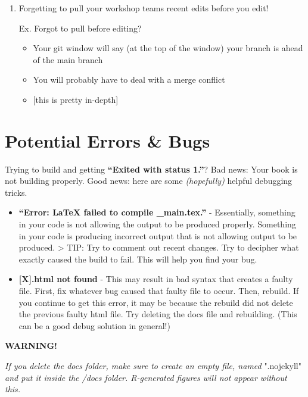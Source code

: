 \documentclass[
]{book}
\providecommand{\tightlist}{%
  \setlength{\itemsep}{0pt}\setlength{\parskip}{0pt}}
\newenvironment{redbox}{
  \definecolor{shadecolor}{RGB}{243, 154, 157}
  \color{white}
  \begin{shaded}}
 {\end{shaded}}
\theoremstyle{definition}
\theoremstyle{definition}
\theoremstyle{definition}
\theoremstyle{definition}
\theoremstyle{remark}
\begin{document}
\begin{enumerate}
\def\labelenumi{\arabic{enumi}.}
\item
  Forgetting to pull your workshop teams recent edits before you edit!

  Ex. Forgot to pull before editing?

  \begin{itemize}
  \tightlist
  \item
    Your git window will say (at the top of the window) your branch is ahead of the main branch
  \item
    You will probably have to deal with a merge conflict
  \item
    {[}this is pretty in-depth{]}
  \end{itemize}
\end{enumerate}

\section{Potential Errors \& Bugs}\label{potential-errors-bugs}

Trying to build and getting \textbf{``Exited with status 1.''}? Bad news: Your book is not building properly. Good news: here are some \emph{(hopefully)} helpful debugging tricks.

\begin{itemize}
\item
  \textbf{``Error: LaTeX failed to compile \_main.tex.''} - Essentially, something in your code is not allowing the output to be produced properly. Something in your code is producing incorrect output that is not allowing output to be produced.
  \textgreater{} TIP: Try to comment out recent changes. Try to decipher what exactly caused the build to fail. This will help you find your bug.
\item
  \textbf{{[}X{]}.html not found} - This may result in bad syntax that creates a faulty file. First, fix whatever bug caused that faulty file to occur. Then, rebuild. If you continue to get this error, it may be because the rebuild did not delete the previous faulty html file. Try deleting the docs file and rebuilding. (This can be a good debug solution in general!)
\end{itemize}

\begin{redbox}

\begin{center}
\textbf{WARNING!}

\end{center}

\emph{If you delete the docs folder, make sure to create an empty file, named }".nojekyll" \emph{and put it inside the /docs folder. R-generated figures will not appear without this.}

\end{redbox}
\end{document}
